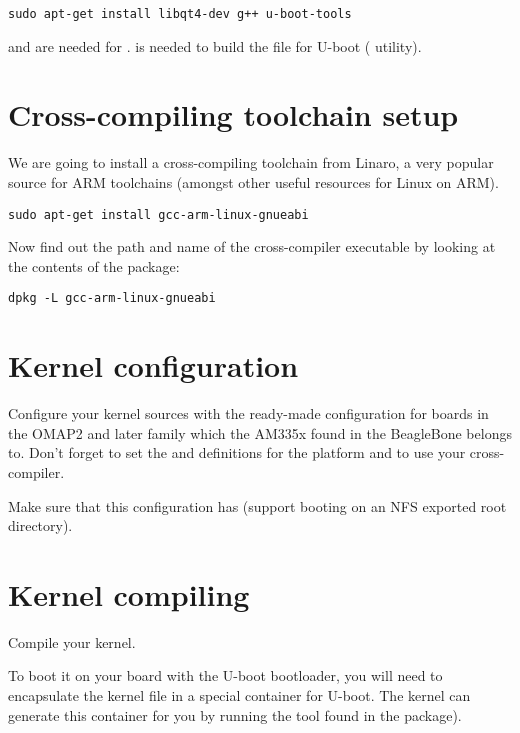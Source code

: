 \begin{verbatim}
sudo apt-get install libqt4-dev g++ u-boot-tools
\end{verbatim}

 and  are needed for .
 is needed to build the  file for
U-boot ( utility).

\section{Cross-compiling toolchain setup}

We are going to install a cross-compiling toolchain from Linaro, a
very popular source for ARM toolchains (amongst other useful resources
for Linux on ARM).

\begin{verbatim}
sudo apt-get install gcc-arm-linux-gnueabi
\end{verbatim}

Now find out the path and name of the cross-compiler executable by looking at the contents of the package:

\begin{verbatim}
dpkg -L gcc-arm-linux-gnueabi
\end{verbatim}

\section{Kernel configuration}

Configure your kernel sources with the ready-made configuration for boards in
the OMAP2 and later family which the AM335x found in the BeagleBone
belongs to. Don't forget to set the  and
 definitions for the  platform and to
use your cross-compiler.

Make sure that this configuration has  (support
booting on an NFS exported root directory).

\section{Kernel compiling}

Compile your kernel.

To boot it on your board with the U-boot bootloader,
you will need to encapsulate the kernel  file
in a special  container for U-boot.
The kernel  can generate this container for you by running the
 tool found in the  package).

